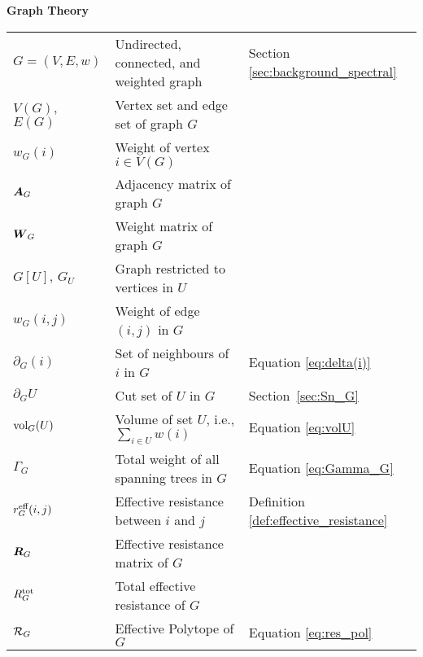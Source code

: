 \vspace{\groupsep}

\noindent \textbf{Graph Theory}\\
\vspace{\headingsep}
\begin{longtable}{p{\colwidth}p{\descsep}l}
	$G=(V,E,w)$ & Undirected, connected, and weighted graph & Section \ref{sec:background_spectral}\\
	$V(G)$, $E(G)$ & Vertex set and edge set of graph $G$\\
	$w_G(i)$ & Weight of vertex $i\in V(G)$\\
	$\vb*{A}_G$ & {Adjacency matrix of graph $G$}\\
	{$\vb*{W}_G$} & {Weight matrix of graph $G$}\\
	$G[U],\, G_U$ & Graph restricted to vertices in $U$  &\\
	$w_G(i,j)$ & Weight of edge $(i,j)$ in $G$ \\
	$\partial_G(i)$ & Set of neighbours of $i$ in $G$ & Equation \eqref{eq:delta(i)}\\
	$\partial_G U$ & Cut set of $U$ in $G$ & Section~\ref{sec:Sn_G}\\
	
	$\textnormal{vol}_G(U)$ & Volume of set $U$, i.e., $\sum_{i\in U}w(i)$ & Equation \eqref{eq:volU}\\
	$\Gamma_G$ & Total weight of all spanning trees in $G$ & Equation \eqref{eq:Gamma_G} \\
	$r^{\textnormal{eff}}_G(i,j)$  & Effective resistance between $i$ and $j$ & Definition \ref{def:effective_resistance}\\
	$\vb*{R}_G$  & Effective resistance matrix of $G$ & \\
	$R^{\textnormal{tot}}_G$ & Total effective resistance of $G$ \\
	$\mathcal{R}_G$ & Effective Polytope of $G$ & Equation \eqref{eq:res_pol}
\end{longtable}
\vspace{\groupsep}


